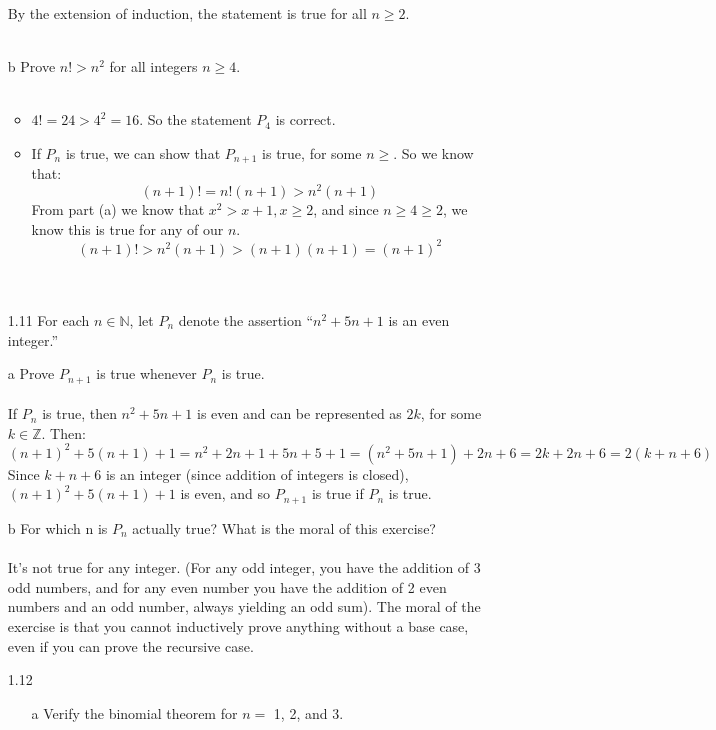 \begin{itemize}
      By the extension of induction, the statement is true for all $n \geq 2$.\\\\

    \item [b] Prove $n! > n^2$ for all integers $n \geq 4$.\\\\
      \begin{itemize}
        \item 
          $4! = 24 > 4^2 = 16$. So the statement $P_4$ is correct.

        \item
          If $P_n$ is true, we can show that $P_{n+1}$ is true, for some $n \geq$. So we know that:
          $$(n+1)! = n!(n+1) > n^2(n+1)$$
          From part (a) we know that $x^2 > x + 1, x \geq 2$, and since $n \geq 4 \geq 2$, we know this is true for any of our $n$.
          $$(n+1)! > n^2(n+1) > (n+1)(n+1) = (n+1)^2$$ \\\\
      \end{itemize}
  \item [1.11]
    For each $n \in \mathds{N}$, let $P_n$ denote the assertion ``$n^2 + 5n + 1$ is an even integer.''
    \item [a] Prove $P_{n+1}$ is true whenever $P_n$ is true.\\\\

      If $P_n$ is true, then $n^2 + 5n + 1$ is even and can be represented as $2k$, for some $k \in \mathds{Z}$.
      Then:
      $$(n+1)^2 + 5(n+1) + 1 = n^2 + 2n + 1 + 5n + 5 + 1 = (n^2+5n+1) + 2n + 6 = 2k + 2n + 6 = 2(k + n + 6)$$
      Since $k + n + 6$ is an integer (since addition of integers is closed), $(n+1)^2 + 5(n+1) + 1$ is even, and so $P_{n+1}$ is true if $P_n$ is true.\\

    \item [b] For which n is $P_n$ actually true? What is the moral of this exercise?\\\\

      It's not true for any integer. (For any odd integer, you have the addition of 3 odd numbers, and for any even number you have the addition of 2 even numbers and an odd number, always yielding an odd sum). The moral of the exercise is that you cannot inductively prove anything without a base case, even if you can prove the recursive case.
  \item [1.12]
    \begin{itemize}
    \item [a] 
      Verify the binomial theorem for $n = $ 1, 2, and 3.\\\\
      

\end{itemize}
\end{itemize}
